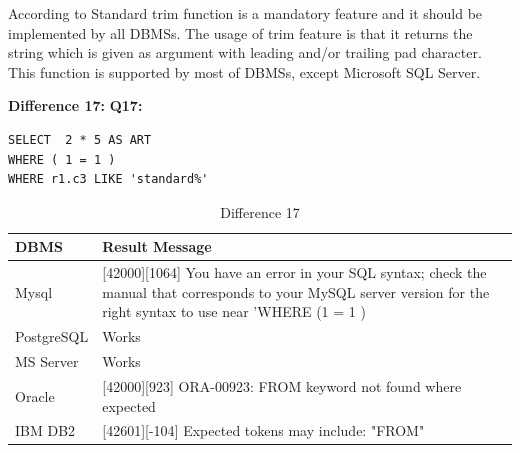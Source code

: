 \hfill\newpage
According to Standard trim function is a mandatory feature and it should be implemented by all DBMSs. The usage of trim feature is that it returns the string which is given as argument with leading and/or trailing pad character. This function is supported by most of DBMSs, except Microsoft SQL Server. 


\hfill\newline\textbf{Difference 17:}
\hfill\newline\textbf{Q17:}

\begin{mdframed}[backgroundcolor=lightgray!20]
\begin{lstlisting}[style=SQL]
SELECT  2 * 5 AS ART
WHERE ( 1 = 1 )
WHERE r1.c3 LIKE 'standard%'
\end{lstlisting}
\end{mdframed}


\begin{table}[h]
\centering
\caption{Difference 17}
\label{my-label}
\begin{tabular}{|p{2cm}|p{11.5cm}| }
\hline
\textbf{DBMS} & \textbf{Result Message}                                                                                                                                                     \\ \hline
Mysql         & {[}42000{]}{[}1064{]} You have an error in your SQL syntax; check the manual that corresponds to your MySQL server version for the right syntax to use near 'WHERE (1 = 1 ) \\ \hline
PostgreSQL    & Works                                                                                                                                                                       \\ \hline
MS Server     & Works                                                                                                                                                                       \\ \hline
Oracle        & {[}42000{]}{[}923{]} ORA-00923: FROM keyword not found where expected                                                                                                       \\ \hline
IBM DB2       & {[}42601{]}{[}-104{]} Expected tokens may include: "FROM"                                                                                                                   \\ \hline
\end{tabular}
\end{table}

